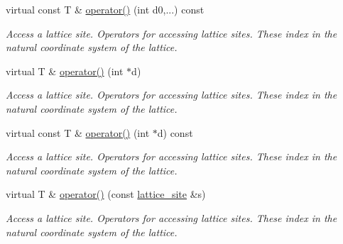 \begin{DoxyCompactItemize}
\mbox{\label{classsisl_1_1cartesian__cubic_a8c3e5d7c1471efb3acf1ce5a946f0785}} 
virtual const T \& \hyperlink{classsisl_1_1cartesian__cubic_a8c3e5d7c1471efb3acf1ce5a946f0785}{operator()} (int d0,...) const
\begin{DoxyCompactList}\small\item\em Access a lattice site. Operators for accessing lattice sites. These index in the natural coordinate system of the lattice. \end{DoxyCompactList}\item 
\mbox{\label{classsisl_1_1cartesian__cubic_a184aa9f24329d92c953a33d5d7df2f82}} 
virtual T \& \hyperlink{classsisl_1_1cartesian__cubic_a184aa9f24329d92c953a33d5d7df2f82}{operator()} (int $\ast$d)
\begin{DoxyCompactList}\small\item\em Access a lattice site. Operators for accessing lattice sites. These index in the natural coordinate system of the lattice. \end{DoxyCompactList}\item 
\mbox{\label{classsisl_1_1cartesian__cubic_a5ab2dfd1ffe49aea1e38384647b3c9b0}} 
virtual const T \& \hyperlink{classsisl_1_1cartesian__cubic_a5ab2dfd1ffe49aea1e38384647b3c9b0}{operator()} (int $\ast$d) const
\begin{DoxyCompactList}\small\item\em Access a lattice site. Operators for accessing lattice sites. These index in the natural coordinate system of the lattice. \end{DoxyCompactList}\item 
\mbox{\label{classsisl_1_1cartesian__cubic_a8cd465a0731e0d2e962329ba3a8e4f6e}} 
virtual T \& \hyperlink{classsisl_1_1cartesian__cubic_a8cd465a0731e0d2e962329ba3a8e4f6e}{operator()} (const \hyperlink{namespacesisl_acd18feee4026583db6185df2b25434aa}{lattice\+\_\+site} \&s)
\begin{DoxyCompactList}\small\item\em Access a lattice site. Operators for accessing lattice sites. These index in the natural coordinate system of the lattice. \end{DoxyCompactList}\item 
\mbox{\label{classsisl_1_1cartesian__cubic_accef876590df812ec191ef66445fd6c7}} 

\end{DoxyCompactItemize}
